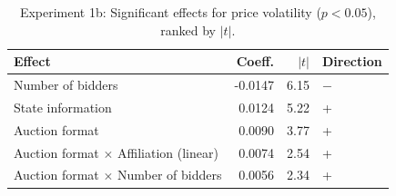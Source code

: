 \begin{table}[H]
\centering
\caption{Experiment 1b: Significant effects for price volatility ($p < 0.05$), ranked by $|t|$.}
\label{tab:exp1b_ranked_vol}
\begin{tabular}{lrrl}
\toprule
\textbf{Effect} & \textbf{Coeff.} & \textbf{$|t|$} & \textbf{Direction} \\
\midrule
Number of bidders & -0.0147 & 6.15 & $-$ \\
State information & 0.0124 & 5.22 & + \\
Auction format & 0.0090 & 3.77 & + \\
Auction format $\times$ Affiliation (linear) & 0.0074 & 2.54 & + \\
Auction format $\times$ Number of bidders & 0.0056 & 2.34 & + \\
\bottomrule
\end{tabular}
\end{table}
